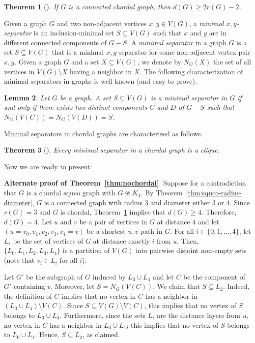 \documentclass[12pt]{article}
\newtheorem{theorem}{Theorem}[section]
\newtheorem{lemma}[theorem]{Lemma}
\begin{document}
\begin{theorem}[{\cite[Theorem~3.5]{CN84}}]\label{thm:chordal-radius-diameter}
If $G$ is a connected chordal graph, then $d(G)\ge 2r(G)-2$.
\end{theorem}

Given a graph $G$ and two non-adjacent vertices $x,y\in V(G)$, a \emph{minimal $x,y$-separator} is an inclusion-minimal set $S\subseteq V(G)$ such that $x$ and $y$ are in different connected components of $G-S$. 
A \emph{minimal separator} in a graph $G$ is a set $S\subseteq V(G)$ that is a minimal $x,y$-separator for some
non-adjacent vertex pair $x,y$.  
Given a graph $G$ and a set $X\subseteq V(G)$, we denote by $N_G(X)$ the set of all vertices in $V(G)\setminus X$ having a neighbor in $X$. 
The following characterization of minimal separators in graphs is well known (and easy to prove).

\begin{lemma}\label{lem:minimal-separators}
  Let $G$ be a graph. 
  A set $S\subseteq V(G)$ is a minimal separator in $G$ if and only if there exists two distinct components $C$ and
  $D$ of $G-S$ such that \hbox{$N_G(V(C)) = N_G(V(D)) = S$}.
\end{lemma}

Minimal separators in chordal graphs are characterized as follows.

\begin{theorem}[\cite{Dir61}]\label{thm:Dirac} Every minimal separator in a chordal graph is a clique.
\end{theorem}

Now we are ready to present:\bigskip

\textbf{Alternate proof of Theorem~\ref{thm:nochordal}}.  Suppose for a contradiction that $G$ is a chordal squco graph with $G\ncong K_1$.
By Theorem~\ref{thm:squco-radius-diameter}, $G$ is a connected graph with radius $3$ and diameter either $3$ or $4$.  
Since $r(G) = 3$ and $G$ is chordal, Theorem~\ref{thm:chordal-radius-diameter} implies that $d(G)\ge 4$.  
Therefore, $d(G) = 4$.  
Let $u$ and $v$ be a pair of vertices in $G$ at distance $4$ and let $(u = v_0,v_1,v_2,v_3,v_4 = v)$ be a shortest $u,v$-path in $G$.  
For all $i\in \{0,1,\ldots, 4\}$, let $L_i$ be the set of vertices of $G$ at distance exactly $i$ from $u$.  Then, $\{L_0, L_1, L_2, L_3, L_4\}$ is a partition of $V(G)$ into pairwise disjoint non-empty sets (note that $v_i\in L_i$ for all $i$).

Let $G'$ be the subgraph of $G$ induced by $L_3\cup L_4$ and let $C$ be the component of $G'$ containing $v$.  
Moreover, let $S = N_G(V(C))$.  
We claim that $S\subseteq L_2$.  
Indeed, the definition of $C$ implies that no vertex in $C$ has a neighbor in $(L_3\cup L_4)\setminus V(C)$.  
Since $S\subseteq V(G)\setminus V(C)$, this implies that no vertex of $S$ belongs to $L_3\cup L_4$.
Furthermore, since the sets $L_i$ are the distance layers from $u$, no vertex in $C$ has a neighbor in $L_0\cup L_1$; this implies that no vertex of $S$ belongs to $L_0\cup L_1$.  
Hence, $S\subseteq L_2$, as claimed.
\end{document}
